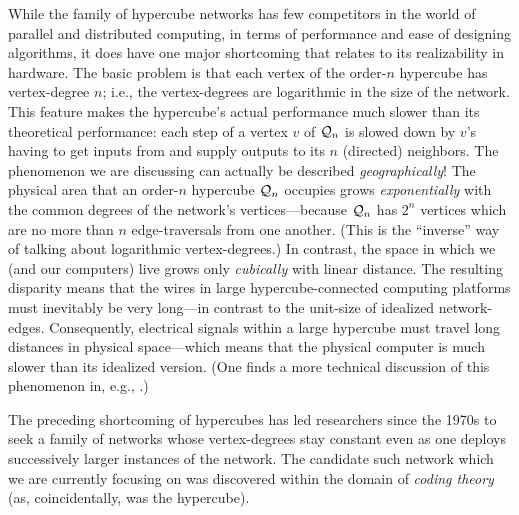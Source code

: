 While the family of hypercube networks has few competitors in the
world of parallel and distributed computing, in terms of performance
and ease of designing algorithms, it does have one major shortcoming
that relates to its realizability in hardware.  The basic problem is that each vertex of the
order-$n$ hypercube has vertex-degree $n$; i.e., the vertex-degrees are logarithmic
in the size of the network.  This feature makes the hypercube's actual
performance much slower than its theoretical performance: each step of a vertex $v$ of $\mbox{$\cal Q$}_n$ is slowed down by $v$'s having
to get inputs from and supply outputs to its $n$ (directed) neighbors.  The phenomenon we are discussing can actually
be described {\em geographically}!  The physical area that an order-$n$ hypercube $\mbox{$\cal Q$}_n$ occupies grows
{\em exponentially} with the
common degrees of the network's vertices---because $\mbox{$\cal Q$}_n$ has $2^n$ vertices which are no more than $n$ 
edge-traversals from one another.  (This is the ``inverse'' way
of talking about logarithmic vertex-degrees.)  In contrast, the space in which we (and our computers) live grows only 
{\em cubically} with linear distance.  The resulting disparity means that the wires in large hypercube-connected
computing platforms must inevitably be very long---in contrast to the unit-size
of idealized network-edges.  Consequently, electrical signals within a
large hypercube must travel long distances in physical space---which means that the
physical computer is much slower than its idealized version.  (One
finds a more technical discussion of this phenomenon in, e.g., \cite{Ullman84}.)

The preceding shortcoming of hypercubes has led researchers since the 1970s to seek a
family of networks whose vertex-degrees stay constant even as one
deploys successively larger instances of the network.  The candidate
such network which we are currently focusing on was discovered within the domain of {\it coding theory} (as,
coincidentally, was the hypercube).  

